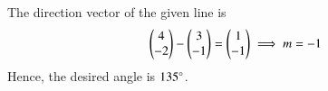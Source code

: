 The direction vector of the given line is 
\begin{align}
\begin{pmatrix}4\\-2\end{pmatrix}-\begin{pmatrix}3\\-1\end{pmatrix}
=
\begin{pmatrix} 1\\ -1 \end{pmatrix} \implies m =-1
\end{align}
Hence, the desired angle is $135\degree$.
